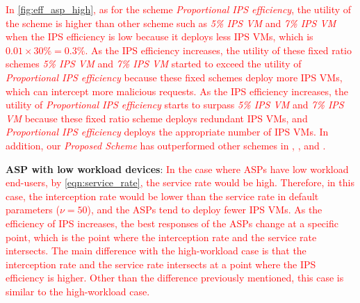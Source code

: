 \documentclass[10pt,journal, compsoc]{IEEEtran}
\begin{document}
\textcolor{red}{
In \cref{fig:eff_asp_high}, as for the scheme \textit{Proportional IPS efficiency}, the utility of the scheme is higher than other scheme such as \textit{5\% IPS VM} and \textit{7\% IPS VM} when the IPS efficiency is low because it deploys less IPS VMs, which is $0.01 \times 30\% = 0.3\%$. As the IPS efficiency increases, the utility of these fixed ratio schemes \textit{5\% IPS VM} and \textit{7\% IPS VM} started to exceed the utility of \textit{Proportional IPS efficiency} because these fixed schemes deploy more IPS VMs, which can intercept more malicious requests. As the IPS efficiency increases, the utility of \textit{Proportional IPS efficiency} starts to surpass \textit{5\% IPS VM} and \textit{7\% IPS VM} because these fixed ratio scheme deploys redundant IPS VMs, and \textit{Proportional IPS efficiency} deploys the appropriate number of IPS VMs. In addition, our \textit{Proposed Scheme} has outperformed other schemes in , , and .}


\textbf{ASP with low workload devices}:
\textcolor{red}{
In the case where ASPs have low workload end-users, by \cref{eqn:service_rate}, the service rate would be high. Therefore, in this case, the interception rate would be lower than the service rate in default parameters ($\nu = 50$), and the ASPs tend to deploy fewer IPS VMs. As the efficiency of IPS increases, the best responses of the ASPs change at a specific point, which is the point where the interception rate and the service rate intersects. The main difference with the high-workload case is that the interception rate and the service rate intersects at a point where the IPS efficiency is higher. Other than the difference previously mentioned, this case is similar to the high-workload case.}
\end{document}
